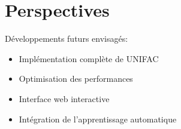 \documentclass[12pt,a4paper]{report}
\begin{document}
\section{Perspectives}
Développements futurs envisagés:
\begin{itemize}
    \item Implémentation complète de UNIFAC
    \item Optimisation des performances
    \item Interface web interactive
    \item Intégration de l'apprentissage automatique
\end{itemize}
\end{document}
